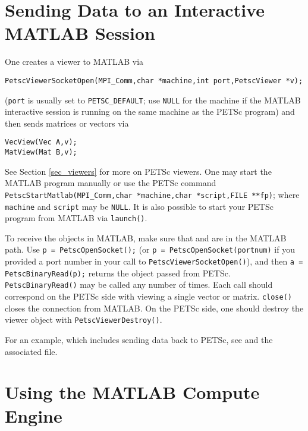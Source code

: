 \section{Sending Data to an Interactive MATLAB Session}
\label{sec_matlabsocket}

One creates a viewer to MATLAB via
\begin{lstlisting}
PetscViewerSocketOpen(MPI_Comm,char *machine,int port,PetscViewer *v);
\end{lstlisting}
(\lstinline{port} is usually set to \lstinline{PETSC_DEFAULT}; use \lstinline{NULL} for the machine if the
MATLAB interactive session is running on the same machine as the PETSc program)
and then sends matrices or vectors via
\begin{lstlisting}
VecView(Vec A,v);
MatView(Mat B,v);
\end{lstlisting}
See Section \ref{sec_viewers} for more on PETSc viewers.
One may start the MATLAB program manually or use the PETSc command
\lstinline{PetscStartMatlab(MPI_Comm,char *machine,char *script,FILE **fp)}; where \lstinline{machine} and \lstinline{script} may be \lstinline{NULL}.
It is also possible to start your PETSc program from MATLAB via \lstinline{launch()}.

To receive the objects in MATLAB, make sure that  and 
are in the MATLAB path. Use \break\lstinline{p = PetscOpenSocket();} (or \lstinline{p = PetscOpenSocket(portnum)} if you provided a port number in
your call to \lstinline{PetscViewerSocketOpen()}), and then \lstinline{a = PetscBinaryRead(p);} returns the object passed from PETSc.
\lstinline{PetscBinaryRead()} may be called any number of times. Each call should correspond on the PETSc side with
viewing a single vector or matrix. \lstinline{close()} closes the connection from MATLAB.
On the PETSc side, one should destroy the viewer object with \lstinline{PetscViewerDestroy()}. 

For an example, which includes sending data back to PETSc, see \href{http://www.mcs.anl.gov/petsc/petsc-current/src/vec/vec/examples/tutorials/ex42.c.html}{} and the associated  file.

\section{Using the MATLAB Compute Engine}
\label{sec_matlabengine}

